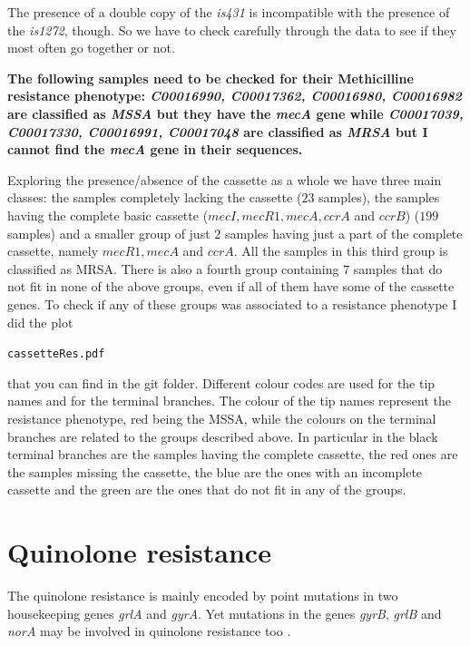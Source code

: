 \documentclass[12pt,a4paper]{article}
\begin{document}
The presence of a double copy of the \textit{is431} is incompatible with the presence of the \textit{is1272}, though. So we have to check carefully through the data to see if they most often go together or not. 


\textbf{The following samples need to be checked for their Methicilline resistance phenotype:
 \textit{ C00016990, C00017362, C00016980, C00016982} are classified as \textit{MSSA} but they have the \textit{mecA} gene while  \textit{C00017039, C00017330, C00016991, C00017048 } are classified as \textit{MRSA} but I cannot find the \textit{mecA} gene in their sequences.}

Exploring the presence/absence of the cassette as a whole we have three main classes: the samples completely lacking the cassette ($23$ samples), the samples having the complete basic cassette ($mecI, mecR1, mecA, ccrA$ and $ccrB$) ($199$ samples) and a smaller group of just $2$ samples having just a part of the complete cassette, namely $mecR1,mecA$ and $ccrA$. All the samples in this third group is classified as MRSA. There is also a fourth group containing $7$ samples that do not fit in none of the above groups, even if all of them have some of the cassette genes.
To check if any of these groups was associated to a resistance phenotype I did the plot 

 \verb!cassetteRes.pdf!
 
 that you can find in the git folder. Different colour codes are used for the tip names and for the terminal branches. The colour of the tip names represent the resistance phenotype, red being the MSSA, while the colours on the terminal branches are related to the groups described above. In particular in the black terminal branches are the samples having the complete cassette, the red ones are the samples missing the cassette, the blue are the ones with an incomplete cassette and the green are the ones that do not fit in any of the groups.  
 
 
\section{Quinolone resistance}
The quinolone resistance is mainly encoded by point mutations in two housekeeping genes \textit{grlA} and \textit{gyrA}. Yet mutations in the genes \textit{gyrB}, \textit{grlB} and \textit{norA} may be involved in quinolone resistance too \cite{gordon}.
\end{document}
